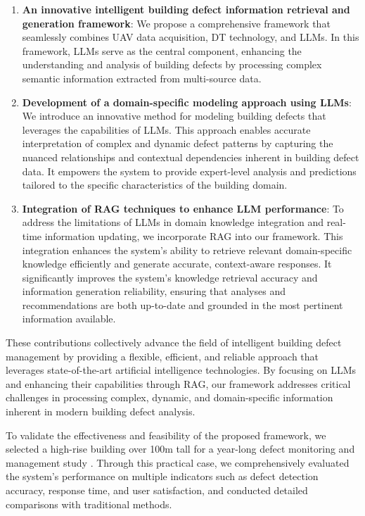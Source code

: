 \documentclass[a4paper,fleqn]{cas-sc}
\begin{document}
\begin{enumerate}
\item \textbf{An innovative intelligent building defect information retrieval and generation framework}: We propose a comprehensive framework that seamlessly combines UAV data acquisition, DT technology, and LLMs. In this framework, LLMs serve as the central component, enhancing the understanding and analysis of building defects by processing complex semantic information extracted from multi-source data.

\item \textbf{Development of a domain-specific modeling approach using LLMs}: We introduce an innovative method for modeling building defects that leverages the capabilities of LLMs. This approach enables accurate interpretation of complex and dynamic defect patterns by capturing the nuanced relationships and contextual dependencies inherent in building defect data. It empowers the system to provide expert-level analysis and predictions tailored to the specific characteristics of the building domain.

\item \textbf{Integration of RAG techniques to enhance LLM performance}: To address the limitations of LLMs in domain knowledge integration and real-time information updating, we incorporate RAG into our framework. This integration enhances the system's ability to retrieve relevant domain-specific knowledge efficiently and generate accurate, context-aware responses. It significantly improves the system's knowledge retrieval accuracy and information generation reliability, ensuring that analyses and recommendations are both up-to-date and grounded in the most pertinent information available.
\end{enumerate}

These contributions collectively advance the field of intelligent building defect management by providing a flexible, efficient, and reliable approach that leverages state-of-the-art artificial intelligence technologies. By focusing on LLMs and enhancing their capabilities through RAG, our framework addresses critical challenges in processing complex, dynamic, and domain-specific information inherent in modern building defect analysis.

To validate the effectiveness and feasibility of the proposed framework, we selected a high-rise building over 100m tall for a year-long defect monitoring and management study \cite{zhang2023automated}. Through this practical case, we comprehensively evaluated the system's performance on multiple indicators such as defect detection accuracy, response time, and user satisfaction, and conducted detailed comparisons with traditional methods.
\end{document}

